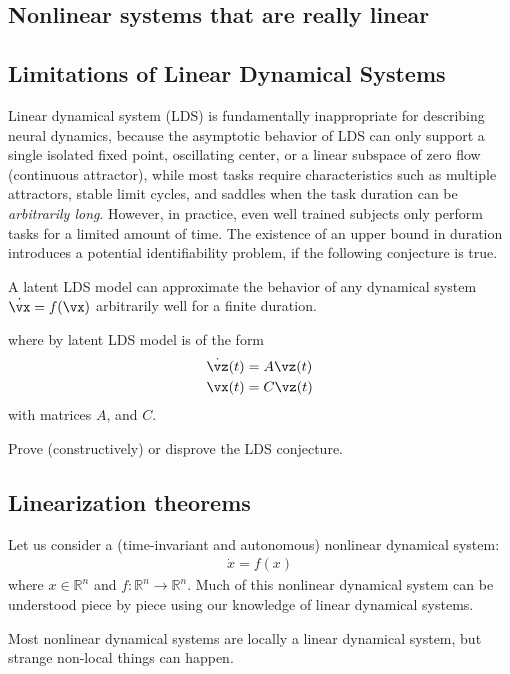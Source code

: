 \documentclass[a4paper,11pt]{exam}
\newcounter{ct}
\newcommand{\field}[1]{\ensuremath{\mathbb{#1}}}
\newcommand{\reals}{\field{R}}
\begin{document}
\begin{questions}
\newpage
\section{Nonlinear systems that are really linear}
\subsection{Limitations of Linear Dynamical Systems}
Linear dynamical system (LDS) is fundamentally inappropriate for describing neural dynamics, because the asymptotic behavior of LDS can only support a single isolated fixed point, oscillating center, or a linear subspace of zero flow (continuous attractor), while most tasks require characteristics such as multiple attractors, stable limit cycles, and saddles when the task duration can be \emph{arbitrarily long}.
However, in practice, even well trained subjects only perform tasks for a limited amount of time.
The existence of an upper bound in duration introduces a potential identifiability problem, if the following conjecture is true.
\begin{tcolorbox}[colback=red!20!white,title=Universal latent LDS conjecture]
    A latent LDS model can approximate the behavior of any dynamical system $\dot{\vx} = f(\vx)$ arbitrarily well for a finite duration.
\end{tcolorbox}
where by latent LDS model is of the form
\begin{align}
    \dot{\vz}(t) &= A \vz(t)
\\
    \vx(t) &= C \vz(t)
\end{align}
with matrices $A$, and $C$.

\question[10] Prove (constructively) or disprove the LDS conjecture.

\subsection{Linearization theorems}
Let us consider a (time-invariant and autonomous) nonlinear dynamical system:
\begin{align}
    \dot{x} = f(x)
\end{align}
where $x \in \reals^n$ and $f: \reals^n \to \reals^n$.
Much of this nonlinear dynamical system can be understood piece by piece using our knowledge of linear dynamical systems.

\begin{tcolorbox}[colback=black!1!,title=Linearize that beast!]
    Most nonlinear dynamical systems are locally a linear dynamical system, but strange non-local things can happen.
\end{tcolorbox}


\end{questions}
\end{document}
